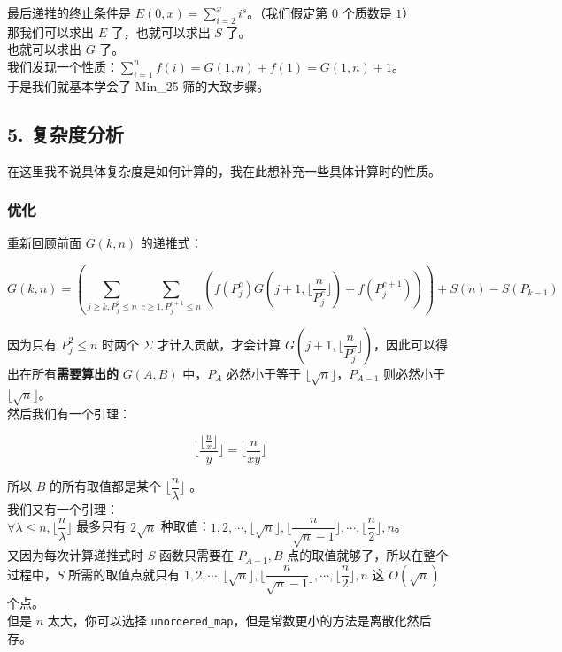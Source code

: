 \documentclass[
]{article}
\begin{document}
最后递推的终止条件是
\(E(0,x)=\displaystyle\sum_{i=2}^xi^s\)。（我们假定第 \(0\) 个质数是
\(1\)）\\
那我们可以求出 \(E\) 了，也就可以求出 \(S\) 了。\\
也就可以求出 \(G\) 了。\\
我们发现一个性质：\(\displaystyle\sum_{i=1}^nf(i)=G(1,n)+f(1)=G(1,n)+1\)。\\
于是我们就基本学会了 Min\_25 筛的大致步骤。

\subsection{\texorpdfstring{5. 复杂度分析
}{5. 复杂度分析 }}\label{5-ux590dux6742ux5ea6ux5206ux6790}

在这里我不说具体复杂度是如何计算的，我在此想补充一些具体计算时的性质。

\subsubsection{优化}\label{ux4f18ux5316}

重新回顾前面 \(G(k,n)\) 的递推式：

\[G(k,n)=\left(\sum_{j\ge k,P_j^2\le n}\sum_{c \ge1,P_{j}^{c+1}\le n}\left(f(P_j^c)G(j+1,\lfloor\frac{n}{P_j^c}\rfloor)+f(P_{j}^{c+1})\right)\right)+S(n)-S(P_{k-1})\]

因为只有 \(P_j^2\le n\) 时两个 \(\Sigma\) 才计入贡献，才会计算
\(G(j+1,\lfloor\dfrac{n}{P_j^c}\rfloor)\)，因此可以得出在所有\textbf{需要算出的}
\(G(A,B)\) 中，\(P_A\) 必然小于等于
\(\lfloor\sqrt{n}\rfloor\)，\(P_{A-1}\) 则必然小于
\(\lfloor\sqrt{n}\rfloor\)。\\
然后我们有一个引理：

\[\lfloor\frac{\lfloor\frac{n}{x}\rfloor}{y}\rfloor=\lfloor\frac{n}{xy}\rfloor\]

所以 \(B\) 的所有取值都是某个 \(\lfloor\dfrac{n}{\lambda}\rfloor\) 。\\
我们又有一个引理：\\
\(\forall\lambda\le n,\lfloor\dfrac{n}{\lambda}\rfloor\) 最多只有
\(2\sqrt{n}\)
种取值：\(1,2,\cdots,\lfloor\sqrt{n}\rfloor,\lfloor\dfrac{n}{\sqrt{n}-1}\rfloor,\cdots,\lfloor\dfrac{n}{2}\rfloor,n\)。\\
又因为每次计算递推式时 \(S\) 函数只需要在 \(P_{A-1},B\)
点的取值就够了，所以在整个过程中，\(S\) 所需的取值点就只有
\(1,2,\cdots,\lfloor\sqrt{n}\rfloor,\lfloor\dfrac{n}{\sqrt{n}-1}\rfloor,\cdots,\lfloor\dfrac{n}{2}\rfloor,n\)
这 \(O(\sqrt{n})\) 个点。\\
但是 \(n\) 太大，你可以选择
\texttt{unordered\_map}，但是常数更小的方法是离散化然后存。
\end{document}
